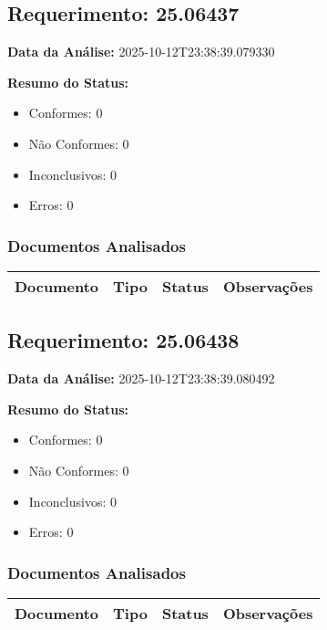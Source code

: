 \documentclass[12pt,a4paper]{article}
\begin{document}
\subsection{Requerimento: 25.06437}

\textbf{Data da Análise:} 2025-10-12T23:38:39.079330

\textbf{Resumo do Status:}
\begin{itemize}
    \item Conformes: 0
    \item Não Conformes: 0
    \item Inconclusivos: 0
    \item Erros: 0
\end{itemize}

\subsubsection{Documentos Analisados}

\begin{longtable}{|p{4cm}|p{2cm}|p{2cm}|p{6cm}|}
\hline
\textbf{Documento} & \textbf{Tipo} & \textbf{Status} & \textbf{Observações} \\
\hline
\endhead
\end{longtable}


\subsection{Requerimento: 25.06438}

\textbf{Data da Análise:} 2025-10-12T23:38:39.080492

\textbf{Resumo do Status:}
\begin{itemize}
    \item Conformes: 0
    \item Não Conformes: 0
    \item Inconclusivos: 0
    \item Erros: 0
\end{itemize}

\subsubsection{Documentos Analisados}

\begin{longtable}{|p{4cm}|p{2cm}|p{2cm}|p{6cm}|}
\hline
\textbf{Documento} & \textbf{Tipo} & \textbf{Status} & \textbf{Observações} \\
\hline
\endhead
\end{longtable}
\end{document}
